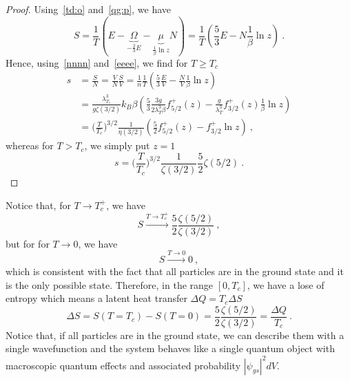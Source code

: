     \begin{proof}
        Using~\eqref{td:o} and~\eqref{qg:p}, we have 
        \begin{equation*}
            S = \frac{1}{T} (E - \underbrace{\Omega}_{- \frac{2}{3}E} - \underbrace{\mu}_{\frac{1}{\beta} \ln z} N) = \frac{1}{T} (\frac{5}{3} E - N \frac{1}{\beta} \ln z)  ~.
        \end{equation*}
        Hence, using~\eqref{nnnn} and~\eqref{eeee}, we find for $T \geq T_c$
        \begin{equation*}
        \begin{aligned}
            s & = \frac{S}{N} = \frac{V}{N} \frac{S}{V} = \frac{1}{n} \frac{1}{T} (\frac{5}{3} \frac{E}{V} - \frac{N}{V} \frac{1}{\beta} \ln z) \\ & = \frac{\lambda_{T_c}^3}{g \zeta(3/2)} k_B \beta ( \frac{5}{3} \frac{3g}{2 \lambda_T^3 \beta} f^+_{5/2} (z) - \frac{g}{\lambda_T^3} f^+_{3/2} (z) \frac{1}{\beta} \ln z) \\ & = \Big ( \frac{T}{T_c} \Big)^{3/2} \frac{1}{\eta(3/2)} (\frac{5}{2} f^+_{5/2} (z) - f^+_{3/2} \ln z) ~,
        \end{aligned}
        \end{equation*}
        whereas for $T > T_c$, we simply put $z = 1$ 
        \begin{equation*}
            s = \Big ( \frac{T}{T_c} \Big)^{3/2} \frac{1}{\zeta (3/2)} \frac{5}{2} \zeta(5/2) ~.
        \end{equation*}
    \end{proof}
    Notice that, for $T \rightarrow T_c^+$, we have 
    \begin{equation*}
        S \xrightarrow{T \rightarrow T_c^+} \frac{5}{2} \frac{\zeta(5/2)}{\zeta(3/2)} ~,
    \end{equation*}
    but for for $T \rightarrow 0$, we have 
    \begin{equation*}
        S \xrightarrow{T \rightarrow 0} 0 ~,
    \end{equation*} 
    which is consistent with the fact that all particles are in the ground state and it is the only possible state. Therefore, in the range $[0, T_c]$, we have a lose of entropy which means a latent heat transfer $\Delta Q = T_c \Delta S$
    \begin{equation*}
        \Delta S = S(T=T_c) - S(T=0) = \frac{5}{2} \frac{\zeta(5/2)}{\zeta(3/2)} = \frac{\Delta Q}{T_c} ~.
    \end{equation*}
    Notice that, if all particles are in the ground state, we can describe them with a single wavefunction and the system behaves like a single quantum object with macroscopic quantum effects and associated probability $|\psi_{gs}|^2 dV$. 

